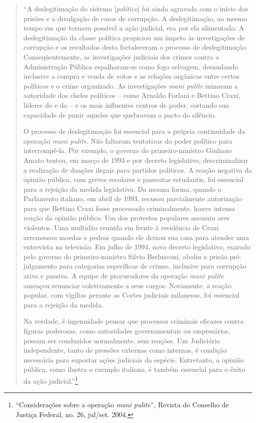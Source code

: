 \begin{quote}
``A deslegitimação do sistema {[}\emph{político}{]} foi ainda agravada
com o início das prisões e a divulgação de casos de corrupção. A
deslegitimação, ao mesmo tempo em que tornava possível a ação judicial,
era por ela alimentada: A deslegitimação da classe política propiciou um
ímpeto às investigações de corrupção e os resultados desta fortaleceram
o processo de deslegitimação. Conseqüentemente, as investigações
judiciais dos crimes contra a Administração Pública espalharam-se como
fogo selvagem, desnudando inclusive a compra e venda de votos e as
relações orgânicas entre certos políticos e o crime organizado. As
investigações \textit{mani pulite} minaram a autoridade dos chefes políticos --
como Arnaldo Forlani e Bettino Craxi, líderes do  e do  -- e os
mais influentes centros de poder, cortando sua capacidade de punir
aqueles que quebravam o pacto do silêncio.

O processo de deslegitimação foi essencial para a própria continuidade
da operação \textit{mani pulite}. Não faltaram tentativas do poder político
para interrompê-la. Por exemplo, o governo do primeiro-ministro Giuliano
Amato tentou, em março de 1993 e por decreto legislativo,
descriminalizar a realização de doações ilegais para partidos políticos.
A reação negativa da opinião pública, com greves escolares e passeatas
estudantis, foi essencial para a rejeição da medida legislativa. Da
mesma forma, quando o Parlamento italiano, em abril de 1993, recusou
parcialmente autorização para que Bettino Craxi fosse processado
criminalmente, houve intensa reação da opinião pública. Um dos protestos
populares assumiu ares violentos. Uma multidão reunida em frente à
residência de Craxi arremessou moedas e pedras quando ele deixou sua
casa para atender uma entrevista na televisão. Em julho de 1994, novo
decreto legislativo, exarado pelo governo do primeiro-ministro Silvio
Berlusconi, aboliu a prisão pré-julgamento para categorias específicas
de crimes, inclusive para corrupção ativa e passiva. A equipe de
procuradores da operação \textit{mani pulite} ameaçou renunciar coletivamente a
seus cargos. Novamente, a reação popular, com vigílias perante as Cortes
judiciais milanesas, foi essencial para a rejeição da medida.

Na verdade, é ingenuidade pensar que processos criminais eficazes contra
figuras poderosas, como autoridades governamentais ou empresários,
possam ser conduzidos normalmente, sem reações. Um Judiciário
independente, tanto de pressões externas como internas, é condição
necessária para suportar ações judiciais da espécie. Entretanto, a
opinião pública, como ilustra o exemplo italiano, é também essencial
para o êxito da ação judicial.''\footnote{``Considerações sobre a
  operação \textit{mani pulite}'', Revista do Conselho de Justiça Federal, no.
  26, jul/set. 2004.}
\end{quote}

